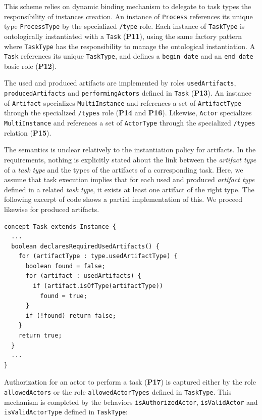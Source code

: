 This scheme relies on \FML dynamic binding mechanism to delegate to task types
the responsibility of instances creation. An instance of \texttt{Process}
references its unique type \texttt{ProcessType} by the specialized
\texttt{/type} role. Each instance of \texttt{TaskType} is ontologically
instantiated with a \texttt{Task} (\textbf{P11}), using the same factory
pattern where \texttt{TaskType} has the responsibility to manage the
ontological instantiation. A \texttt{Task} references its unique
\texttt{TaskType}, and defines a \texttt{begin date} and an \texttt{end date}
basic role (\textbf{P12}).

The used and produced artifacts are implemented by roles
\texttt{usedArtifacts}, \texttt{producedArtifacts} and
\texttt{performingActors} defined in \texttt{Task} (\textbf{P13}). An instance
of \texttt{Artifact} specializes \texttt{MultiInstance} and references a set of
\texttt{ArtifactType} through the specialized \texttt{/types} role
(\textbf{P14} and \textbf{P16}). Likewise, \texttt{Actor} specializes
\texttt{MultiInstance} and references a set of \texttt{ActorType} through the
specialized \texttt{/types} relation (\textbf{P15}).

The semantics is unclear relatively to the instantiation policy for artifacts.
In the requirements, nothing is explicitly stated about the link between the
\emph{artifact type} of a \emph{task type} and the types of the artifacts of a
corresponding task.  Here, we assume that task execution implies that for each
used and produced \emph{artifact type} defined in a related \emph{task type},
it exists at least one artifact of the right type. The following excerpt of
\FML code shows a partial implementation of this. We proceed likewise for
produced artifacts.

\begin{lstlisting}
concept Task extends Instance {
  ...
  boolean declaresRequiredUsedArtifacts() {
    for (artifactType : type.usedArtifactType) {
      boolean found = false;
      for (artifact : usedArtifacts) {
        if (artifact.isOfType(artifactType))
          found = true;
      }
      if (!found) return false;
    }
    return true;
  }
  ...
}
\end{lstlisting}

Authorization for an actor to perform a task (\textbf{P17}) is captured either
by the role \texttt{allowedActors} or the role \texttt{allowedActorTypes}
defined in \texttt{TaskType}. This mechanism is completed by the behaviors
\texttt{isAuthorizedActor}, \texttt{isValidActor} and \texttt{isValidActorType}
defined in \texttt{TaskType}:


